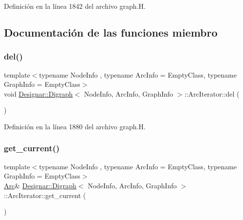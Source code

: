 Definición en la línea 1842 del archivo graph.\+H.



\subsection{Documentación de las funciones miembro}
\mbox{\label{class_designar_1_1_digraph_1_1_arc_iterator_aa4f42b888685025c5c3f2e730df4eb36}} 
\subsubsection{\texorpdfstring{del()}{del()}}
{\footnotesize\ttfamily template$<$typename Node\+Info , typename Arc\+Info  = Empty\+Class, typename Graph\+Info  = Empty\+Class$>$ \\
void \hyperlink{class_designar_1_1_digraph}{Designar\+::\+Digraph}$<$ Node\+Info, Arc\+Info, Graph\+Info $>$\+::Arc\+Iterator\+::del (\begin{DoxyParamCaption}{ }\end{DoxyParamCaption})\hspace{0.3cm}{\ttfamily [inline]}}



Definición en la línea 1880 del archivo graph.\+H.

\mbox{\label{class_designar_1_1_digraph_1_1_arc_iterator_af7734cd84a4dd523f276064833abaa85}} 
\subsubsection{\texorpdfstring{get\+\_\+current()}{get\_current()}\hspace{0.1cm}{\footnotesize\ttfamily [1/2]}}
{\footnotesize\ttfamily template$<$typename Node\+Info , typename Arc\+Info  = Empty\+Class, typename Graph\+Info  = Empty\+Class$>$ \\
\hyperlink{class_designar_1_1_digraph_a0ceb278671f2a535c00fddccdeafd69f}{Arc}\& \hyperlink{class_designar_1_1_digraph}{Designar\+::\+Digraph}$<$ Node\+Info, Arc\+Info, Graph\+Info $>$\+::Arc\+Iterator\+::get\+\_\+current (\begin{DoxyParamCaption}{ }\end{DoxyParamCaption})\hspace{0.3cm}{\ttfamily [inline]}}



